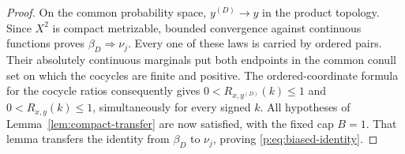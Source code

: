 \begin{proof}
On the common probability space, $y^{(D)}\to y$ in the product topology.
Since $X^2$ is compact metrizable, bounded convergence against continuous
functions proves $\beta_D\Rightarrow\nu_j$.  Every one of these laws
is carried by ordered pairs.  Their absolutely continuous marginals
put both endpoints in the common conull set on which the cocycles are
finite and positive.  The ordered-coordinate formula for the cocycle
ratios consequently gives $0<R_{x,y^{(D)}}(k)\le1$ and
$0<R_{x,y}(k)\le1$, simultaneously for every signed $k$.
All hypotheses of Lemma~\ref{lem:compact-transfer} are now satisfied,
with the fixed cap $B=1$.  That lemma transfers the identity from
$\beta_D$ to $\nu_j$, proving \eqref{p:eq:biased-identity}.
\end{proof}
